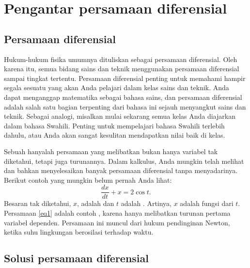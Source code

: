\sectionnewpage
\section{Pengantar persamaan diferensial}
\label{introde:section}



\subsection{Persamaan diferensial}

Hukum-hukum fisika umumnya dituliskan sebagai persamaan diferensial.
Oleh karena itu, semua bidang sains dan teknik menggunakan persamaan diferensial sampai tingkat tertentu.
Persamaan diferensial penting untuk memahami hampir segala sesuatu yang akan
Anda pelajari dalam kelas sains dan teknik.
Anda dapat menganggap matematika sebagai bahasa sains, dan
persamaan diferensial adalah salah satu bagian terpenting dari bahasa ini
sejauh menyangkut sains dan teknik. Sebagai analogi,
misalkan mulai sekarang semua kelas Anda diajarkan dalam bahasa Swahili.
Penting untuk mempelajari bahasa Swahili terlebih dahulu, atau Anda akan sangat
kesulitan mendapatkan nilai baik di kelas.

Sebuah \emph{} hanyalah persamaan yang melibatkan
bukan hanya variabel tak diketahui, tetapi juga turunannya.
Dalam kalkulus, Anda mungkin telah melihat dan bahkan menyelesaikan banyak
persamaan diferensial tanpa menyadarinya.
Berikut contoh yang mungkin belum pernah Anda lihat:
\begin{equation} \label{eq1}
\frac{dx}{dt} + x = 2 \cos t .
\end{equation}
Besaran tak diketahui, $x$, adalah \emph{} dan $t$ adalah
\emph{}. Artinya, $x$ adalah fungsi dari $t$.
Persamaan \eqref{eq1}
adalah contoh \emph{}, karena
hanya melibatkan turunan pertama variabel dependen.
Persamaan ini muncul dari hukum pendinginan Newton, ketika suhu lingkungan
berosilasi terhadap waktu.

\subsection{Solusi persamaan diferensial}

